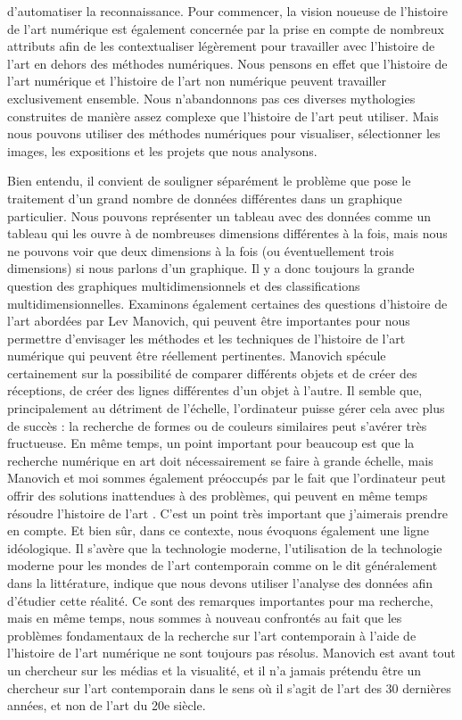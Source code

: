 \documentclass[a4paper, twoside, 12pt]{book}
\begin{document}
d'automatiser la reconnaissance. Pour commencer, la vision noueuse de l'histoire de l'art numérique est également concernée par la prise en compte de nombreux attributs afin de les contextualiser légèrement pour travailler avec l'histoire de l'art en dehors des méthodes numériques. Nous pensons en effet que l'histoire de l'art numérique et l'histoire de l'art non numérique peuvent travailler exclusivement ensemble. Nous n'abandonnons pas ces diverses mythologies construites de manière assez complexe que l'histoire de l'art peut utiliser. Mais nous pouvons utiliser des méthodes numériques pour visualiser, sélectionner les images, les expositions et les projets que nous analysons. 

Bien entendu, il convient de souligner séparément le problème que pose le traitement d'un grand nombre de données différentes dans un graphique particulier. Nous pouvons représenter un tableau avec des données comme un tableau qui les ouvre à de nombreuses dimensions différentes à la fois, mais nous ne pouvons voir que deux dimensions à la fois (ou éventuellement trois dimensions) si nous parlons d'un graphique. Il y a donc toujours la grande question des graphiques multidimensionnels et des classifications multidimensionnelles. Examinons également certaines des questions d'histoire de l'art abordées par Lev Manovich, qui peuvent être importantes pour nous permettre d'envisager les méthodes et les techniques de l'histoire de l'art numérique qui peuvent être réellement pertinentes. Manovich spécule certainement sur la possibilité de comparer différents objets et de créer des réceptions, de créer des lignes différentes d'un objet à l'autre. Il semble que, principalement au détriment de l'échelle, l'ordinateur puisse gérer cela avec plus de succès : la recherche de formes ou de couleurs similaires peut s'avérer très fructueuse. En même temps, un point important pour beaucoup est que la recherche numérique en art doit nécessairement se faire à grande échelle, mais Manovich et moi sommes également préoccupés par le fait que l'ordinateur peut offrir des solutions inattendues à des problèmes, qui peuvent en même temps résoudre l'histoire de l'art . C'est un point très important que j'aimerais prendre en compte. Et bien sûr, dans ce contexte, nous évoquons également une ligne idéologique. Il s'avère que la technologie moderne, l'utilisation de la technologie moderne pour les mondes de l'art contemporain comme on le dit généralement dans la littérature, indique que nous devons utiliser l'analyse des données afin d'étudier cette réalité.  Ce sont des remarques importantes pour ma recherche, mais en même temps, nous sommes à nouveau confrontés au fait que les problèmes fondamentaux de la recherche sur l'art contemporain à l'aide de l'histoire de l'art numérique ne sont toujours pas résolus. Manovich est avant tout un chercheur sur les médias et la visualité, et il n'a jamais prétendu être un chercheur sur l'art contemporain dans le sens où il s'agit de l'art des 30 dernières années, et non de l'art du 20e siècle.
\end{document}
